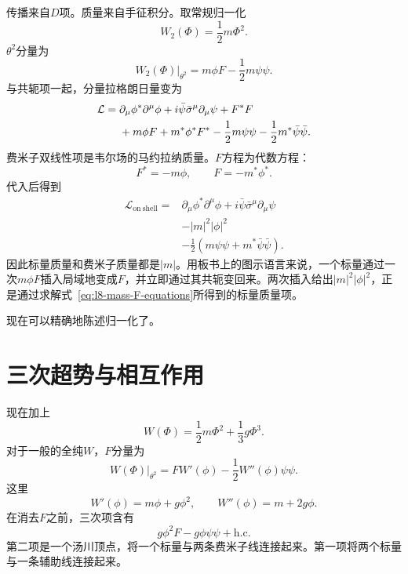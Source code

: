 传播来自\(D\)项。质量来自手征积分。取常规归一化
\begin{equation}
W_2(\Phi)=\frac12m\Phi^2.
\end{equation}
\(\theta^2\)分量为
\begin{equation}
\left.W_2(\Phi)\right|_{\theta^2}
=m\phi F-\frac12m\psi\psi.
\end{equation}
与共轭项一起，分量拉格朗日量变为
\begin{align}
\mathcal L
={}&
\partial_\mu\phi^\ast\partial^\mu\phi
+i\bar\psi\bar\sigma^\mu\partial_\mu\psi
+F^\ast F
\notag\\
&+m\phi F+m^\ast\phi^\ast F^\ast
-\frac12m\psi\psi
-\frac12m^\ast\bar\psi\bar\psi.
\label{eq:l8-mass-offshell}
\end{align}
费米子双线性项是韦尔场的马约拉纳质量。\(F\)方程为代数方程：
\begin{equation}
F^\ast=-m\phi,
\qquad
F=-m^\ast\phi^\ast.
\label{eq:l8-mass-F-equations}
\end{equation}
代入后得到
\begin{equation}
\begin{aligned}
\mathcal L_{\mathrm{on\ shell}}={}&
\partial_\mu\phi^\ast\partial^\mu\phi
+i\bar\psi\bar\sigma^\mu\partial_\mu\psi\\
&-|m|^2|\phi|^2\\
&-\frac12\left(m\psi\psi+m^\ast\bar\psi\bar\psi\right).
\end{aligned}
\label{eq:l8-mass-onshell}
\end{equation}
因此标量质量和费米子质量都是\(|m|\)。用板书上的图示语言来说，一个标量通过一次\(m\phi F\)插入局域地变成\(F\)，并立即通过其共轭变回来。两次插入给出\(|m|^2|\phi|^2\)，正是通过求解式~\eqref{eq:l8-mass-F-equations}所得到的标量质量项。

现在可以精确地陈述归一化了。

\section{三次超势与相互作用}

现在加上
\begin{equation}
W(\Phi)=\frac12m\Phi^2+\frac13g\Phi^3.
\label{eq:l8-superpotential}
\end{equation}
对于一般的全纯\(W\)，\(F\)分量为
\begin{equation}
\left.W(\Phi)\right|_{\theta^2}
=F W'(\phi)-\frac12W''(\phi)\psi\psi.
\label{eq:l8-W-components}
\end{equation}
这里
\begin{equation}
W'(\phi)=m\phi+g\phi^2,
\qquad
W''(\phi)=m+2g\phi.
\end{equation}
在消去\(F\)之前，三次项含有
\begin{equation}
g\phi^2F-g\phi\psi\psi+\text{h.c.}
\label{eq:l8-cubic-offshell}
\end{equation}
第二项是一个汤川顶点，将一个标量与两条费米子线连接起来。第一项将两个标量与一条辅助线连接起来。

